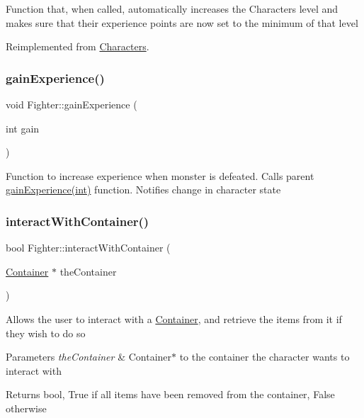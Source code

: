 Function that, when called, automatically increases the Character\textquotesingle{}s level and makes sure that their experience points are now set to the minimum of that level 

Reimplemented from \hyperlink{class_characters_ac5909582bf15fe17b7a6fa5104c26dd6}{Characters}.

\hypertarget{class_fighter_af411947929c37ef0a0eab87b0c45f4f3}{}\label{class_fighter_af411947929c37ef0a0eab87b0c45f4f3} 
\subsubsection{\texorpdfstring{gain\+Experience()}{gainExperience()}}
{\footnotesize\ttfamily void Fighter\+::gain\+Experience (\begin{DoxyParamCaption}\item[{int}]{gain }\end{DoxyParamCaption})}

Function to increase experience when monster is defeated. Calls parent \hyperlink{class_fighter_af411947929c37ef0a0eab87b0c45f4f3}{gain\+Experience(int)} function. Notifies change in character state \hypertarget{class_fighter_a66c0adfa4979fa3ac994359a188121a8}{}\label{class_fighter_a66c0adfa4979fa3ac994359a188121a8} 
\subsubsection{\texorpdfstring{interact\+With\+Container()}{interactWithContainer()}}
{\footnotesize\ttfamily bool Fighter\+::interact\+With\+Container (\begin{DoxyParamCaption}\item[{\hyperlink{class_container}{Container} $\ast$}]{the\+Container }\end{DoxyParamCaption})}

Allows the user to interact with a \hyperlink{class_container}{Container}, and retrieve the items from it if they wish to do so 
\begin{DoxyParams}{Parameters}
{\em the\+Container} & Container$\ast$ to the container the character wants to interact with \\
\hline
\end{DoxyParams}
\begin{DoxyReturn}{Returns}
bool, True if all items have been removed from the container, False otherwise 
\end{DoxyReturn}
\hypertarget{class_fighter_a69dccfbc61abf5720e8a329203158d1e}{}\label{class_fighter_a69dccfbc61abf5720e8a329203158d1e} 

